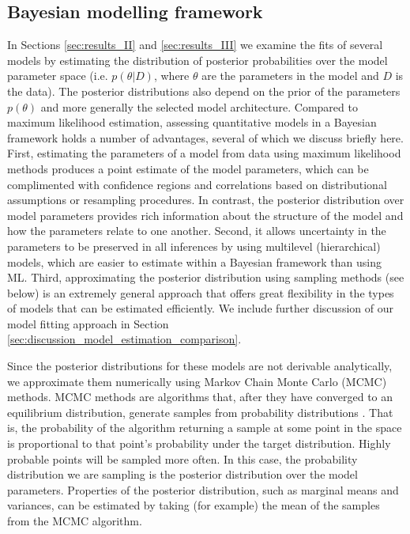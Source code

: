\documentclass[11pt,a4paper]{article}
\begin{document}
\subsection{Bayesian modelling framework}
\label{sec:bayes_method}

In Sections \ref{sec:results_II} and \ref{sec:results_III} we examine the fits of several models by estimating the distribution of posterior probabilities over the model parameter space (i.e. $p(\theta | D)$, where $\theta$ are the parameters in the model and $D$ is the data).
The posterior distributions also depend on the prior of the parameters $p(\theta)$ and more generally the selected model architecture.
Compared to maximum likelihood estimation, assessing quantitative models in a Bayesian framework holds a number of advantages, several of which we discuss briefly here.
First, estimating the parameters of a model from data using maximum likelihood methods produces a point estimate of the model parameters, which can be complimented with confidence regions and correlations based on distributional assumptions or resampling procedures.
In contrast, the posterior distribution over model parameters provides rich information about the structure of the model and how the parameters relate to one another.
Second, it allows uncertainty in the parameters to be preserved in all inferences by using multilevel (hierarchical) models, which are easier to estimate within a Bayesian framework than using ML.
Third, approximating the posterior distribution using sampling methods (see below) is an extremely general approach that offers great flexibility in the types of models that can be estimated efficiently.
We include further discussion of our model fitting approach in Section \ref{sec:discussion_model_estimation_comparison}.

Since the posterior distributions for these models are not derivable analytically, we approximate them numerically using Markov Chain Monte Carlo (MCMC) methods.
MCMC methods are algorithms that, after they have converged to an equilibrium distribution, generate samples from probability distributions \citep[see][for a useful introduction]{Kruschke2011a}.
That is, the probability of the algorithm returning a sample at some point in the space is proportional to that point's probability under the target distribution.
Highly probable points will be sampled more often.
In this case, the probability distribution we are sampling is the posterior distribution over the model parameters.
Properties of the posterior distribution, such as marginal means and variances, can be estimated by taking (for example) the mean of the samples from the MCMC algorithm.
\end{document}
